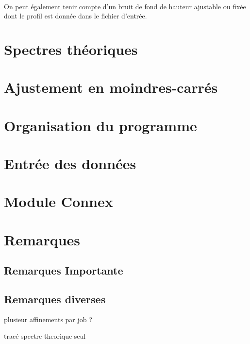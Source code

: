 \documentclass[a4paper]{article}
\begin{document}
\paragraph{}
On peut également tenir compte d'un bruit de fond de hauteur ajustable ou fixée dont le profil est donnée dans le fichier d'entrée.
\newpage
\tableofcontents
\newpage
\section{Spectres théoriques}

\FloatBarrier

\FloatBarrier
\section{Ajustement en moindres-carrés}

\newpage
\section{Organisation du programme}

\newpage
\section{Entrée des données}


\section{Module Connex}
\section{Remarques}
\subsection{Remarques Importante}

\subsection{Remarques diverses}
plusieur affinements par job ?

tracé spectre theorique seul
\newpage


\end{document}
